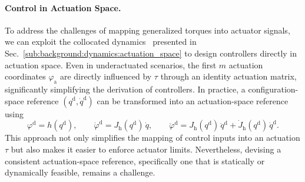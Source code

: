 \paragraph{Control in Actuation Space.}
To address the challenges of mapping generalized torques into actuator signals, we can exploit the collocated dynamics~\citep{pustina2024input} presented in Sec.~\ref{sub:background:dynamics:actuation_space} to design controllers directly in actuation space. Even in underactuated scenarios, the first $m$ actuation coordinates $\varphi_\mathrm{a}$ are directly influenced by $\tau$ through an identity actuation matrix, significantly simplifying the derivation of controllers. In practice, a configuration-space reference $(q^\mathrm{d},\dot{q}^\mathrm{d})$ can be transformed into an actuation-space reference using
\begin{equation}
    \varphi^\mathrm{d} = h(q^\mathrm{d}),
    \qquad
    \dot{\varphi}^\mathrm{d} = J_\mathrm{h}(q^\mathrm{d}) \, \dot{q},
    \qquad
    \ddot{\varphi}^\mathrm{d} = J_\mathrm{h}(q^\mathrm{d}) \, \ddot{q}^\mathrm{d} + \dot{J}_\mathrm{h}(q^\mathrm{d}) \, \dot{q}^\mathrm{d}.
\end{equation}
This approach not only simplifies the mapping of control inputs into an actuation $\tau$ but also makes it easier to enforce actuator limits. Nevertheless, devising a consistent actuation-space reference, specifically one that is statically or dynamically feasible, remains a challenge.

